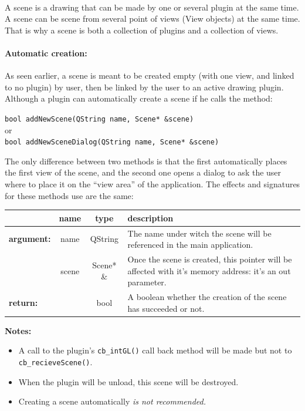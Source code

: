 \documentclass[a4paper]{scrreprt}
\begin{document}
	\paragraph{}
	A scene is a drawing that can be made by one or several plugin at the same
	time. A scene can be scene from several point of views (View objects) at the
	same time. That is why a scene is both a collection of plugins and a collection
	of views.
	\paragraph{Automatic creation: }
	As seen earlier, a scene is meant to be created empty (with one view, and
	linked to no plugin) by user, then be linked by the user to an active drawing
	plugin. Although a plugin can automatically create a scene if he calls the
	method:
	\begin{center}
		\texttt{bool addNewScene(QString name, Scene* \&scene)}\\
		or\\
		\texttt{bool addNewSceneDialog(QString name, Scene* \&scene)}
	\end{center}
	The only difference between two methods is that the first automatically places
	the first view of the scene, and the second one opens a dialog to ask the user
	where to place it on the ``view area'' of the application. The effects and
	signatures for these methods use are the same:\\
	\begin{center}
	\begin{tabular}{|l|c|c|p{}|}
		\hline
		~ & name & type & description
		\\ \hline
		\textbf{argument:} & name & QString & 
			The name under witch the scene will be referenced in the main application.
		\\ \cline{2-4}
		~ & scene & Scene* \& &
			Once the scene is created, this pointer will be affected with it's memory
			address: it's an out parameter.
		\\ \hline
		\textbf{return:} & ~ & bool &
			A boolean whether the creation of the scene has succeeded or not.
		\\ \hline
	\end{tabular}
	\end{center}
	\textbf{Notes:} 
	\begin{itemize}
	  \item A call to the plugin's \texttt{cb\_intGL()} call back method will be
	  made but not to \texttt{cb\_recieveScene()}.
	  \item When the plugin will be unload, this scene will be destroyed.
	  \item Creating a scene automatically \em{is not recommended}.
	\end{itemize}
\end{document}
